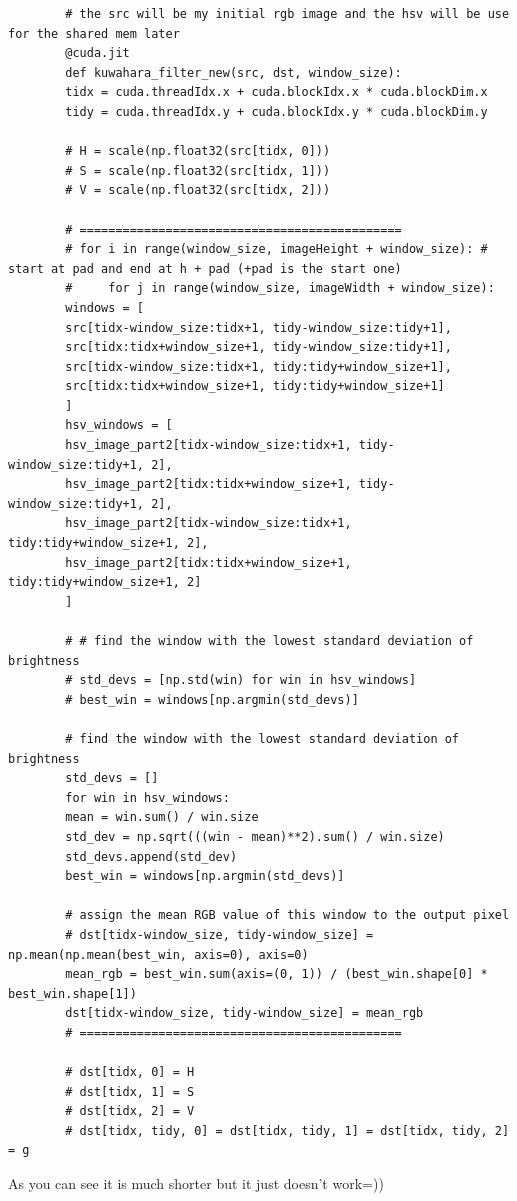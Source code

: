 \documentclass{article}
\begin{document}
	\begin{verbatim}
		# the src will be my initial rgb image and the hsv will be use for the shared mem later
		@cuda.jit
		def kuwahara_filter_new(src, dst, window_size):
		tidx = cuda.threadIdx.x + cuda.blockIdx.x * cuda.blockDim.x
		tidy = cuda.threadIdx.y + cuda.blockIdx.y * cuda.blockDim.y
		
		# H = scale(np.float32(src[tidx, 0]))
		# S = scale(np.float32(src[tidx, 1]))
		# V = scale(np.float32(src[tidx, 2]))
		
		# =============================================
		# for i in range(window_size, imageHeight + window_size): # start at pad and end at h + pad (+pad is the start one)
		#     for j in range(window_size, imageWidth + window_size):
		windows = [
		src[tidx-window_size:tidx+1, tidy-window_size:tidy+1],
		src[tidx:tidx+window_size+1, tidy-window_size:tidy+1],
		src[tidx-window_size:tidx+1, tidy:tidy+window_size+1],
		src[tidx:tidx+window_size+1, tidy:tidy+window_size+1]
		]
		hsv_windows = [
		hsv_image_part2[tidx-window_size:tidx+1, tidy-window_size:tidy+1, 2],
		hsv_image_part2[tidx:tidx+window_size+1, tidy-window_size:tidy+1, 2],
		hsv_image_part2[tidx-window_size:tidx+1, tidy:tidy+window_size+1, 2],
		hsv_image_part2[tidx:tidx+window_size+1, tidy:tidy+window_size+1, 2]
		]
		
		# # find the window with the lowest standard deviation of brightness
		# std_devs = [np.std(win) for win in hsv_windows]
		# best_win = windows[np.argmin(std_devs)]
		
		# find the window with the lowest standard deviation of brightness
		std_devs = []
		for win in hsv_windows:
		mean = win.sum() / win.size
		std_dev = np.sqrt(((win - mean)**2).sum() / win.size)
		std_devs.append(std_dev)
		best_win = windows[np.argmin(std_devs)]
		
		# assign the mean RGB value of this window to the output pixel
		# dst[tidx-window_size, tidy-window_size] = np.mean(np.mean(best_win, axis=0), axis=0)
		mean_rgb = best_win.sum(axis=(0, 1)) / (best_win.shape[0] * best_win.shape[1])
		dst[tidx-window_size, tidy-window_size] = mean_rgb
		# =============================================
		
		# dst[tidx, 0] = H
		# dst[tidx, 1] = S
		# dst[tidx, 2] = V
		# dst[tidx, tidy, 0] = dst[tidx, tidy, 1] = dst[tidx, tidy, 2] = g
	\end{verbatim}
	
	As you can see it is much shorter but it just doesn't work=))
	
\end{document}
